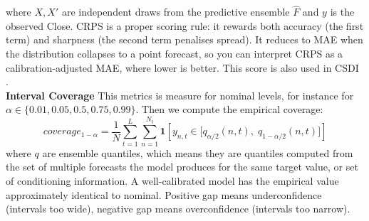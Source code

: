 where \(X,X'\) are independent draws from the predictive ensemble \(\hat{F}\) and \(y\) is the observed Close. CRPS \cite{matheson1976scoring} is a proper scoring rule: it rewards both accuracy (the first term) and sharpness (the second term penalises spread). It reduces to MAE when the distribution collapses to a point forecast, so you can interpret CRPS as a calibration-adjusted MAE, where lower is better. This score is also used in CSDI \cite{tashiro2021csdi}.\\

\textbf{Interval Coverage} This metrics is measure for nominal levels, for instance for \(\alpha \in \{0.01,0.05,0.5,0.75,0.99\}\). Then we compute the empirical coverage:
\[
coverage_{1-\alpha} = \frac{1}{N} \sum_{t=1}^{L} \sum_{n=1}^{N_t} \mathbf{1}\left[y_{n,t} \in \bigl[q_{\alpha/2}(n,t),\; q_{1-\alpha/2}(n,t)\bigr]\right]
\]
where \(q\) are ensemble quantiles, which means they are quantiles computed from the set of multiple forecasts the model produces for the same target value, or set of conditioning information. A well-calibrated model has the empirical value approximately identical to nominal. Positive gap means underconfidence (intervals too wide), negative gap means overconfidence (intervals too narrow).
